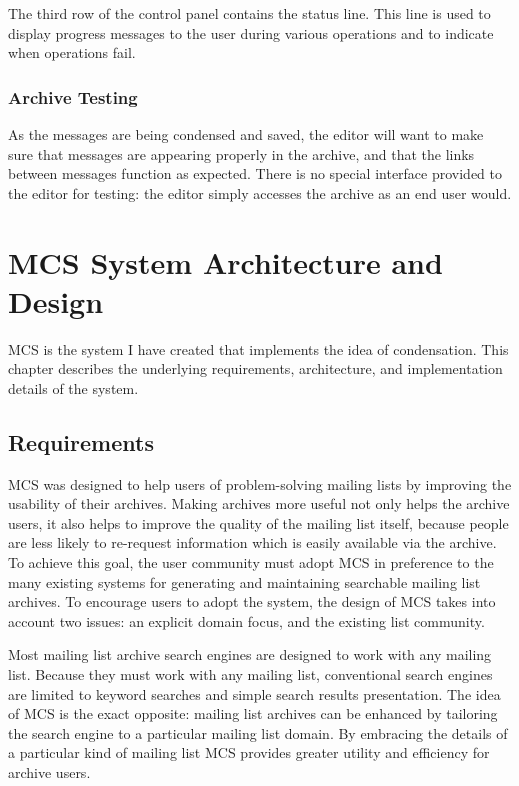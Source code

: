 The third row of the control panel contains the status line. This line is used
to display progress messages to the user during various operations and to
indicate when operations fail.

\subsection{Archive Testing}
As the messages are being condensed and saved, the editor will want to make
sure that messages are appearing properly in the archive, and that the links
between messages function as expected. There is no special interface provided
to the editor for testing: the editor simply accesses the archive as an end
user would.


\chapter{MCS System Architecture and Design}
\label{cha:architecture-design}
MCS is the system I have created that implements the idea of condensation. This
chapter describes the underlying requirements, architecture, and implementation
details of the system.

\section{Requirements}
MCS was designed to help users of problem-solving mailing lists by improving
the usability of their archives. Making archives more useful not only helps the
archive users, it also helps to improve the quality of the mailing list itself,
because people are less likely to re-request information which is easily
available via the archive. To achieve this goal, the user community must adopt
MCS in preference to the many existing systems for generating and maintaining
searchable mailing list archives. To encourage users to adopt the system, the
design of MCS takes into account two issues: an explicit domain focus, and the
existing list community.

Most mailing list archive search engines are designed to work with any mailing
list. Because they must work with any mailing list, conventional search engines
are limited to keyword searches and simple search results presentation. The
idea of MCS is the exact opposite: mailing list archives can be enhanced by
tailoring the search engine to a particular mailing list domain. By embracing
the details of a particular kind of mailing list MCS provides greater utility
and efficiency for archive users.

